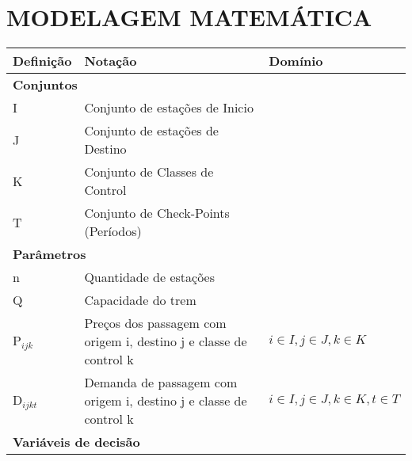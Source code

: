 \documentclass[10pt,a4paper]{article}
\begin{document}
\section{MODELAGEM MATEMÁTICA}

\begin{table}[H]
	\centering
	\small
	\begin{tabular}{@{}lll@{}}
		\toprule
		\textbf{Definição} & \textbf{Notação}                                                                     & \textbf{Domínio}                     \\ \midrule
		\multicolumn{3}{l}{\textbf{Conjuntos}}                                                                                                           \\ \midrule
		I                  & Conjunto de estações de Inicio                                                       &                                      \\
		J                  & Conjunto de estações de Destino                                                      &                                      \\
		K                  & Conjunto de Classes de Control                                                       &                                      \\
		T                  & Conjunto de Check-Points (Períodos)                                                  &                                      \\ \midrule
		\multicolumn{3}{l}{\textbf{Parâmetros}}                                                                                                          \\ \midrule
		n                  & Quantidade de estações                                                               &                                      \\
		Q                  & Capacidade do trem                                                                   &                                      \\
		P$_{ijk}$          & Preços  dos passagem com origem i, destino j e classe de control k                   & $i \in I, j \in J, k \in K$          \\
		D$_{ijkt}$         & Demanda  de passagem com origem i, destino j e classe de control k                   & $i \in I, j \in J, k \in K, t \in T$ \\ \midrule
		\multicolumn{3}{l}{\textbf{Variáveis de decisão}}                                                                                                \\ \midrule

\end{tabular}
\end{table}
\end{document}
